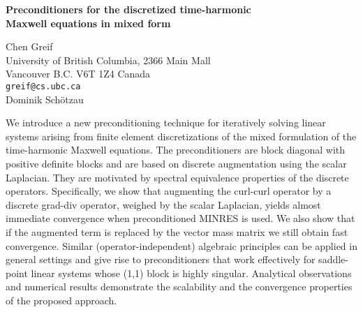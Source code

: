 \documentclass{report}
\begin{document}

\begin{center}
{\large
{\bf Preconditioners for the discretized time-harmonic \\
Maxwell equations in mixed form}}

	Chen Greif \\
	University of British Columbia, 2366 Main Mall \\
	Vancouver B.C.  V6T 1Z4 Canada \\
	{\tt greif@cs.ubc.ca} \\
	Dominik Sch\"otzau
\end{center}
We introduce a new preconditioning technique for iteratively
solving linear systems arising from finite element
discretizations of the mixed formulation of the
time-harmonic Maxwell equations. The preconditioners are
block diagonal with positive definite blocks and are based
on discrete augmentation using the scalar Laplacian. They
are motivated by spectral equivalence properties of the
discrete operators. Specifically, we show that augmenting
the curl-curl operator by a discrete grad-div operator,
weighed by the scalar Laplacian, yields almost immediate
convergence when preconditioned MINRES is used. We also show
that if the augmented term is replaced by the vector mass
matrix we still obtain fast convergence. Similar
(operator-independent) algebraic principles can be applied
in general settings and give rise to preconditioners that
work effectively for saddle-point linear systems whose (1,1)
block is highly singular. Analytical observations and
numerical results demonstrate the scalability and the
convergence properties of the proposed approach.



\end{document}
